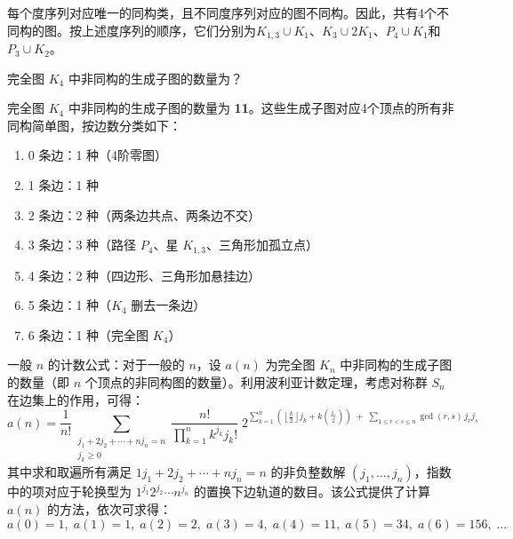 \documentclass[lang=cn,11pt]{elegantbook}
\begin{document}
每个度序列对应唯一的同构类，且不同度序列对应的图不同构。因此，共有4个不同构的图。按上述度序列的顺序，它们分别为$K_{1,3}\cup K_1$、$K_3\cup 2K_1$、$P_4\cup K_1$和$P_3\cup K_2$。

\begin{example}
    完全图 $K_4$ 中非同构的生成子图的数量为？
\end{example}
完全图 $K_4$ 中非同构的生成子图的数量为 \textbf{11}。这些生成子图对应4个顶点的所有非同构简单图，按边数分类如下：
\begin{enumerate}
    \item 0 条边：1 种（4阶零图）
    \item 1 条边：1 种
    \item 2 条边：2 种（两条边共点、两条边不交）
    \item 3 条边：3 种（路径 $P_4$、星 $K_{1,3}$、三角形加孤立点）
    \item 4 条边：2 种（四边形、三角形加悬挂边）
    \item 5 条边：1 种（$K_4$ 删去一条边）
    \item 6 条边：1 种（完全图 $K_4$）
\end{enumerate}
一般 $n$ 的计数公式：对于一般的 $n$，设 $a(n)$ 为完全图 $K_n$ 中非同构的生成子图的数量（即 $n$ 个顶点的非同构图的数量）。利用波利亚计数定理，考虑对称群 $S_n$ 在边集上的作用，可得：
\[
a(n) = \frac{1}{n!} \sum_{\substack{j_1 + 2j_2 + \cdots + n j_n = n \\ j_k \ge 0}} 
\frac{n!}{\prod_{k=1}^n k^{j_k} j_k!} \; 
2^{\sum_{k=1}^n \left(\left\lfloor \frac{k}{2} \right\rfloor j_k+k\binom{j_k}{2}\right) \;+\;
\sum_{1 \le r < s \le n} \gcd(r, s) \, j_r j_s}
\]
其中求和取遍所有满足 $1j_1 + 2j_2 + \cdots + n j_n = n$ 的非负整数解 $(j_1, \ldots, j_n)$，指数中的项对应于轮换型为 $1^{j_1}2^{j_2}\cdots n^{j_n}$ 的置换下边轨道的数目。该公式提供了计算 $a(n)$ 的方法，依次可求得：
\[
a(0)=1,\; a(1)=1,\; a(2)=2,\; a(3)=4,\; a(4)=11,\; a(5)=34,\; a(6)=156,\; \ldots
\]
\end{document}
